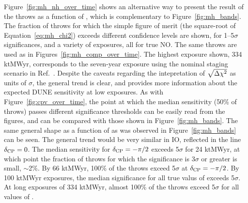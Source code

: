 Figure~\ref{fig:mh_nh_over_time} shows an alternative way to present the result of the throws as a function of \deltacp, which is complementary to Figure~\ref{fig:mh_bands}. The fraction of throws for which the simple figure of merit (the square-root of Equation~\ref{eq:mh_chi2}) exceeds different confidence levels are shown, for 1--5$\sigma$ significances, and a variety of exposures, all for true NO. The same throws are used as in Figures~\ref{fig:mh_comp_over_time}. The highest exposure shown, 334 ktMWyr, corresponds to the seven-year exposure using the nominal staging scenario in Ref.~\cite{Abi:2020qib}. Despite the caveats regarding the intepretation of $\sqrt{\Delta\chi^{2}}$ as units of $\sigma$, the general trend is clear, and provides more information about the expected DUNE sensitivity at low exposures. As with Figure~\ref{fig:cpv_over_time}, the point at which the median sensitivity (50\% of throws) passes different significance thresholds can be easily read from the figures, and can be compared with those shown in Figure~\ref{fig:mh_bands}. The same general shape as a function of \deltacp as was observed in Figure~\ref{fig:mh_bands} can be seen. The general trend would be very similar in IO, reflected in the line $\delta_{\rm CP} = 0$. The median sensitivity for $\delta_{\rm CP} = -\pi/2$ exceeds 5$\sigma$ for 24 ktMWyr, at which point the fraction of throws for which the significance is 3$\sigma$ or greater is small, $\sim$2\%. By 66 ktMWyr, 100\% of the throws exceed 5$\sigma$ at $\delta_{\rm CP} = -\pi/2$. By 100 ktMWyr exposures, the median significance for all true valus of \deltacp exceeds 5$\sigma$. At long exposures of 334 ktMWyr, almost 100\% of the throws exceed 5$\sigma$ for all values of \deltacp.
